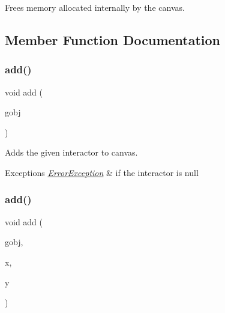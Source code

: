 Frees memory allocated internally by the canvas. 



\subsection{Member Function Documentation}
\mbox{\label{classGCanvas_afe8277e7b2627513c6f7452fb0b2847d}} 
\subsubsection{\texorpdfstring{add()}{add()}\hspace{0.1cm}{\footnotesize\ttfamily [1/4]}}
{\footnotesize\ttfamily void add (\begin{DoxyParamCaption}\item[{\mbox{\hyperlink{classGObject}{G\+Object}} $\ast$}]{gobj }\end{DoxyParamCaption})\hspace{0.3cm}{\ttfamily [virtual]}}



Adds the given interactor to canvas. 


\begin{DoxyExceptions}{Exceptions}
{\em \mbox{\hyperlink{classErrorException}{Error\+Exception}}} & if the interactor is null \\
\hline
\end{DoxyExceptions}
\mbox{\label{classGCanvas_a8bb36f245efc7806414a1339c2befa1c}} 
\subsubsection{\texorpdfstring{add()}{add()}\hspace{0.1cm}{\footnotesize\ttfamily [2/4]}}
{\footnotesize\ttfamily void add (\begin{DoxyParamCaption}\item[{\mbox{\hyperlink{classGObject}{G\+Object}} $\ast$}]{gobj,  }\item[{double}]{x,  }\item[{double}]{y }\end{DoxyParamCaption})\hspace{0.3cm}{\ttfamily [virtual]}}



